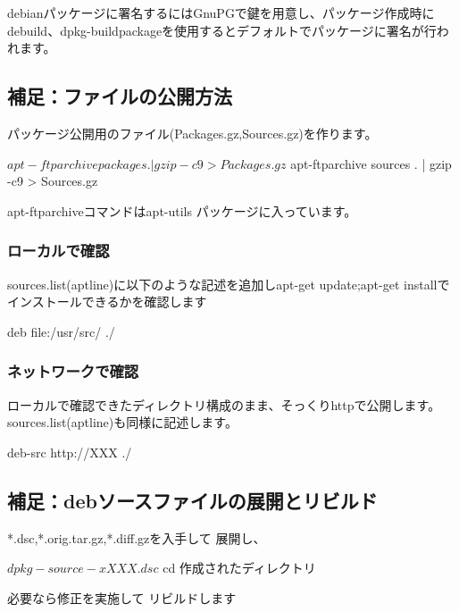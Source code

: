\documentclass[mingoth,a4paper]{jsarticle}
\begin{document}
debianパッケージに署名するにはGnuPGで鍵を用意し、パッケージ作成時にdebuild、dpkg-buildpackageを使用するとデフォルトでパッケージに署名が行われます。


\subsection{補足：ファイルの公開方法}

パッケージ公開用のファイル(Packages.gz,Sources.gz)を作ります。
\begin{commandline}
 $ apt-ftparchive packages . | gzip -c9 > Packages.gz
 $ apt-ftparchive sources . | gzip -c9 > Sources.gz
\end{commandline}

apt-ftparchiveコマンドはapt-utils パッケージに入っています。

\subsubsection{ローカルで確認}

sources.list(aptline)に以下のような記述を追加しapt-get update;apt-get installでインストールできるかを確認します
\begin{commandline}
 deb file:/usr/src/ ./
\end{commandline}

\subsubsection{ネットワークで確認}

ローカルで確認できたディレクトリ構成のまま、そっくりhttpで公開します。sources.list(aptline)も同様に記述します。
\begin{commandline}
 deb-src http://XXX ./
\end{commandline}

\subsection{補足：debソースファイルの展開とリビルド}

*.dsc,*.orig.tar.gz,*.diff.gzを入手して
展開し、

\begin{commandline}
 $ dpkg-source -x XXX.dsc
 $ cd 作成されたディレクトリ
\end{commandline}
必要なら修正を実施して
リビルドします

\end{document}
